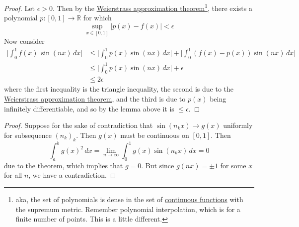   \begin{proof}
    Let $\epsilon > 0$. Then by the \hyperref[thm:weierstrass-approximation-theorem]{Weierstrass approximation theorem}\footnote{aka, the set of polynomials is dense in the set of \hyperref[pst-def:continuous_func]{continuous functions} with the supremum metric. Remember polynomial interpolation, which is for a finite number of points. This is a little different.}, there exists a polynomial $p: [0, 1] \to {}$ for which 
    \begin{equation}
      \sup_{x \in [0, 1]} | p(x) - f(x)| < \epsilon 
    \end{equation}
    Now consider 
    \begin{align}
      \bigg| \int_0^1 f(x) \, \sin(nx) \,dx \bigg| & \leq \bigg| \int_0^1 p(x) \sin(nx) \,dx \bigg| + \bigg| \int_0^1 (f(x) - p(x)) \sin(nx) \,dx \bigg| \\
                                                   & \leq \bigg| \int_0^1 p(x) \sin(nx) \,dx \bigg| + \epsilon \\
                                                   & \leq 2 \epsilon 
    \end{align}
    where the first inequality is the triangle inequality, the second is due to the \hyperref[thm:weierstrass-approximation-theorem]{Weierstrass approximation theorem}, and the third is due to $p(x)$ being infinitely differentiable, and so by the lemma above it is $\leq \epsilon$. 

  \end{proof}

  \begin{theorem}
    \label{thm:the-stone-weierstrass-theorem-2}
    
  \end{theorem}
  \begin{proof}
    Suppose for the sake of contradiction that $\sin(n_k x) \to g(x)$ uniformly for subsequence $(n_k)_k$. Then $g(x)$ must be continuous on $[0, 1]$. Then 
    \begin{equation} 
      \int_a^b g(x)^2 \,dx = \lim_{n \to \infty} \int_0^1 g(x) \sin(n_k x) \,dx = 0
    \end{equation}
    due to the theorem, which implies that $g = 0$. But since $g(nx) = $ for some $x$ for all $n$, we have a contradiction. 
  \end{proof}

